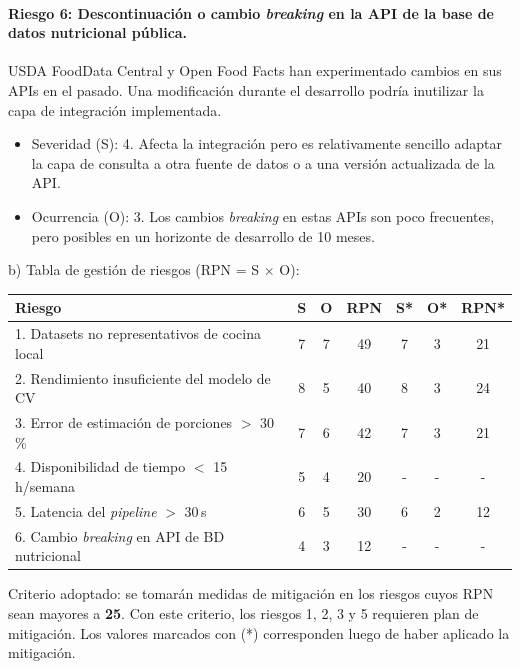 \documentclass[
11pt, %
]{charter}
\begin{document}
\paragraph{Riesgo 6: Descontinuación o cambio \textit{breaking} en la API de la base de datos nutricional pública.}
USDA FoodData Central y Open Food Facts han experimentado cambios en sus APIs en el pasado. Una modificación durante el desarrollo podría inutilizar la capa de integración implementada.
\begin{itemize}
	\item Severidad (S): 4. Afecta la integración pero es relativamente sencillo adaptar la capa de consulta a otra fuente de datos o a una versión actualizada de la API.
	\item Ocurrencia (O): 3. Los cambios \textit{breaking} en estas APIs son poco frecuentes, pero posibles en un horizonte de desarrollo de 10 meses.
\end{itemize}

b) Tabla de gestión de riesgos (RPN = S $\times$ O):

\begin{table}[htpb]
\centering
\begin{tabularx}{\linewidth}{@{}|X|c|c|c|c|c|c|@{}}
\hline
\rowcolor[HTML]{C0C0C0}
Riesgo & S & O & RPN & S* & O* & RPN* \\ \hline
1. Datasets no representativos de cocina local        & 7 & 7 & 49 & 7 & 3 & 21 \\ \hline
2. Rendimiento insuficiente del modelo de CV          & 8 & 5 & 40 & 8 & 3 & 24 \\ \hline
3. Error de estimación de porciones $>$ 30\,\%        & 7 & 6 & 42 & 7 & 3 & 21 \\ \hline
4. Disponibilidad de tiempo $<$ 15\,h/semana          & 5 & 4 & 20 & - & - & - \\ \hline
5. Latencia del \textit{pipeline} $>$ 30\,s           & 6 & 5 & 30 & 6 & 2 & 12 \\ \hline
6. Cambio \textit{breaking} en API de BD nutricional  & 4 & 3 & 12 & - & - &  - \\ \hline
\end{tabularx}%
\end{table}

Criterio adoptado: se tomarán medidas de mitigación en los riesgos cuyos RPN sean mayores a \textbf{25}. Con este criterio, los riesgos 1, 2, 3 y 5 requieren plan de mitigación. Los valores marcados con (*) corresponden luego de haber aplicado la mitigación.
\end{document}
